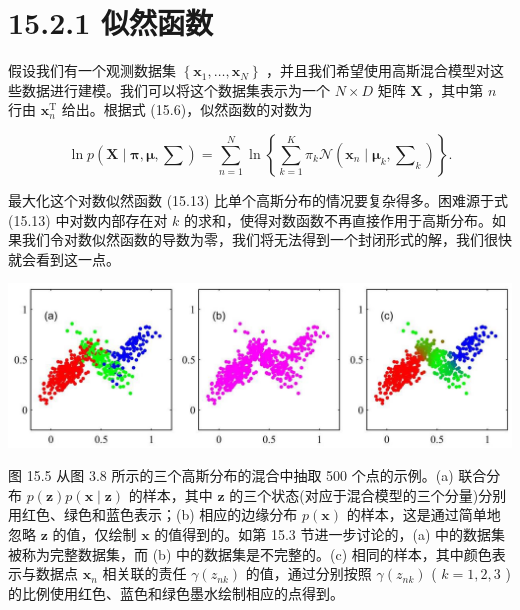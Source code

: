 \documentclass[10pt]{article}
\begin{document}
\section*{15.2.1 似然函数}

假设我们有一个观测数据集 \(\left\{  {{\mathbf{x}}_{1},\ldots ,{\mathbf{x}}_{N}}\right\}\) ，并且我们希望使用高斯混合模型对这些数据进行建模。我们可以将这个数据集表示为一个 \(N \times  D\) 矩阵 \(\mathbf{X}\) ，其中第 \(n\) 行由 \({\mathbf{x}}_{n}^{\mathrm{T}}\) 给出。根据式 (15.6)，似然函数的对数为

\[
\ln p\left( {\mathbf{X} \mid  \mathbf{\pi },\mathbf{\mu },\mathbf{\sum }}\right)  = \mathop{\sum }\limits_{{n = 1}}^{N}\ln \left\{  {\mathop{\sum }\limits_{{k = 1}}^{K}{\pi }_{k}\mathcal{N}\left( {{\mathbf{x}}_{n} \mid  {\mathbf{\mu }}_{k},{\mathbf{\sum }}_{k}}\right) }\right\}  . \tag{15.13}
\]

最大化这个对数似然函数 (15.13) 比单个高斯分布的情况要复杂得多。困难源于式 (15.13) 中对数内部存在对 \(k\) 的求和，使得对数函数不再直接作用于高斯分布。如果我们令对数似然函数的导数为零，我们将无法得到一个封闭形式的解，我们很快就会看到这一点。

\begin{center}
\includegraphics[max width=1.0\textwidth]{images/0194e279-9b28-703a-88f4-c3ac21e2010d_488_255_353_1290_422_0.jpg}
\end{center}
\hspace*{3em} 

图 15.5 从图 3.8 所示的三个高斯分布的混合中抽取 500 个点的示例。(a) 联合分布 \(p\left( \mathbf{z}\right) p\left( {\mathbf{x} \mid  \mathbf{z}}\right)\) 的样本，其中 \(\mathbf{z}\) 的三个状态(对应于混合模型的三个分量)分别用红色、绿色和蓝色表示；(b) 相应的边缘分布 \(p\left( \mathbf{x}\right)\) 的样本，这是通过简单地忽略 \(\mathbf{z}\) 的值，仅绘制 \(\mathbf{x}\) 的值得到的。如第 15.3 节进一步讨论的，(a) 中的数据集被称为完整数据集，而 (b) 中的数据集是不完整的。(c) 相同的样本，其中颜色表示与数据点 \({\mathbf{x}}_{n}\) 相关联的责任 \(\gamma \left( {z}_{nk}\right)\) 的值，通过分别按照 \(\gamma \left( {z}_{nk}\right)\) ( \(k = 1,2,3\) )的比例使用红色、蓝色和绿色墨水绘制相应的点得到。
\end{document}
